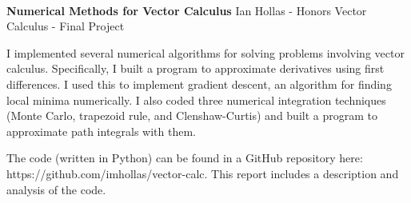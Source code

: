 \documentclass[11pt]{article}
\begin{document}
\thispagestyle{empty}
\bigskip \
\vspace{0.1cm}

\begin{center}
{\fontsize{20}{20} \selectfont \bf \sffamily Numerical Methods for Vector Calculus}
\vskip 14pt
{\fontsize{14}{14} \selectfont \rmfamily Ian Hollas - Honors Vector Calculus - Final Project} 
\vskip 6pt
\vskip 24pt
\end{center}

\large
I implemented several numerical algorithms for solving problems involving vector calculus. Specifically, I built a program to approximate derivatives using first differences. I used this to implement gradient descent, an algorithm for finding local minima numerically. I also coded three numerical integration techniques (Monte Carlo, trapezoid rule, and Clenshaw-Curtis) and built a program to approximate path integrals with them.  
\par
The code (written in Python) can be found in a GitHub repository here: \\ https://github.com/imhollas/vector-calc. This report includes a description and analysis of the code.


\newpage
\microtoc
\newpage

\end{document}
